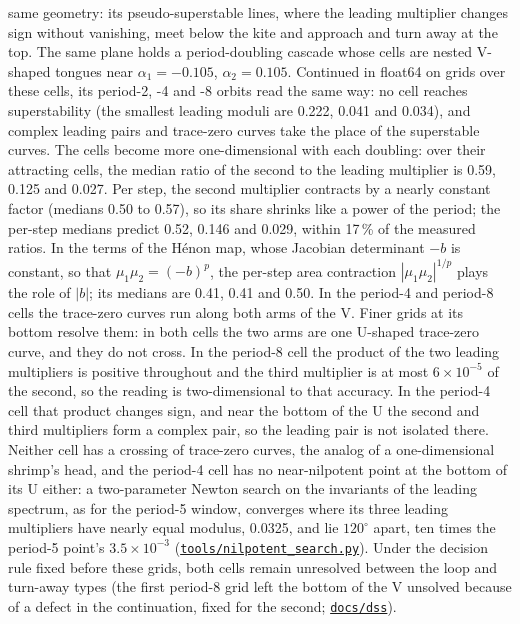 \documentclass[11pt,letterpaper]{article}
\newcommand{\repourl}{https://github.com/tdj28/neural-shrimp}
\newcommand{\reporef}{arxiv-v1}
\newcommand{\repo}[1]{\href{\repourl/blob/\reporef/#1}{\nolinkurl{#1}}}
\begin{document}
same geometry: its pseudo-superstable
lines, where the leading multiplier changes sign without vanishing, meet below the kite and approach and turn away at
the top. The same plane holds a period-doubling cascade whose cells are nested
V-shaped tongues near $\alpha_1=-0.105$, $\alpha_2=0.105$. Continued in float64 on grids over these cells, its
period-2, -4 and -8 orbits read the same way: no cell reaches superstability (the smallest leading moduli are 0.222,
0.041 and 0.034), and complex leading pairs and trace-zero curves take the place of the superstable curves. The cells
become more one-dimensional with each doubling: over their attracting cells, the median ratio of the second to the
leading multiplier is 0.59, 0.125 and 0.027. Per step, the second multiplier contracts by a nearly constant factor
(medians 0.50 to 0.57), so its share shrinks like a power of the period; the per-step medians predict 0.52, 0.146 and
0.029, within 17\,\% of the measured ratios. In the terms of the H\'enon map, whose Jacobian determinant $-b$ is
constant, so that $\mu_1\mu_2=(-b)^p$, the per-step area contraction $|\mu_1\mu_2|^{1/p}$ plays the role of $|b|$;
its medians are 0.41, 0.41 and 0.50. In the period-4 and period-8 cells the trace-zero curves run along both
arms of the V. Finer grids at its bottom resolve them: in both cells the two arms are one U-shaped trace-zero curve,
and they do not cross. In the period-8 cell the product of the two leading multipliers is positive throughout and the
third multiplier is at most $6\times10^{-5}$ of the second, so the reading is two-dimensional to that accuracy. In the
period-4 cell that product changes sign, and near the bottom of the U the second and third multipliers form a
complex pair, so the leading pair is not isolated there. Neither cell has a crossing of trace-zero curves, the
analog of a one-dimensional shrimp's head, and the period-4 cell has no near-nilpotent point at the bottom of its U
either: a two-parameter Newton search on the invariants of the leading spectrum, as for the period-5 window, converges
where its three leading multipliers have nearly equal modulus, 0.0325, and lie $120^{\circ}$ apart, ten times the
period-5 point's $3.5\times10^{-3}$ (\repo{tools/nilpotent_search.py}). Under the decision rule fixed before these
grids, both cells remain unresolved
between the loop and turn-away types (the first period-8 grid left the bottom of the V unsolved because of a defect in
the continuation, fixed for the second; \repo{docs/dss}).
\end{document}
